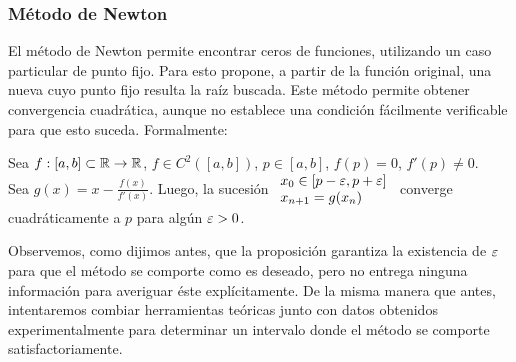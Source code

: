 \subsubsection{Método de Newton}
El método de Newton permite encontrar ceros de funciones, utilizando un caso particular de punto fijo. Para esto propone, a partir de la función original, una nueva cuyo punto fijo resulta la raíz buscada. Este método permite obtener convergencia cuadrática, aunque no establece una condición fácilmente verificable para que esto suceda. Formalmente:
\begin{prop} 
Sea $f: [a,b] \subset \mathbb{R} \rightarrow \mathbb{R}$, $f \in C^{2}([a,b])$, $p\in[a,b]$, $f(p) = 0$, $f'(p) \neq 0$. \\
Sea $g(x) = x - \displaystyle\frac{f(x)}{f'(x)}$. Luego, la sucesión 
	$\begin{array}{l}
		x_0 \in [p-\varepsilon, p+\varepsilon] \\
		x_{n+1} = g(x_n)
	 \end{array}$
converge cuadráticamente a $p$ para algún  $\varepsilon > 0$.
\label{prop_newton}
\end{prop}

Observemos, como dijimos antes, que la proposición garantiza la existencia de $\varepsilon$ para que el método se comporte como es deseado, pero no entrega ninguna información para averiguar éste explícitamente. De la misma manera que antes, intentaremos combiar herramientas teóricas junto con datos obtenidos experimentalmente para determinar un intervalo donde el método se comporte satisfactoriamente.





